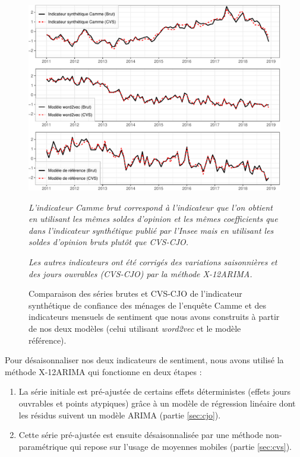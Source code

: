 \documentclass[11pt,french,french]{article}
\begin{document}
\begin{figure}[htp]
{\centering\includegraphics[width = \textwidth]{img/rmd-graphCVS-1}}
\captionsetup{margin=0cm,format=hang,justification=justified}
\caption{Comparaison des séries brutes et CVS-CJO de l'indicateur synthétique de confiance des ménages de l'enquête Camme et des indicateurs mensuels de sentiment que nous avons construits à partir de nos deux modèles (celui utilisant  \emph{word2vec} et le modèle référence).}\label{fig:cvscjo}
\footnotesize

\emph{L'indicateur Camme brut correspond à l'indicateur que l'on obtient en utilisant les mêmes soldes d'opinion et les mêmes coefficients que dans l'indicateur synthétique publié par l'Insee mais en utilisant les soldes d'opinion bruts plutôt que CVS-CJO.}

\emph{Les autres indicateurs ont été corrigés des variations saisonnières et des jours ouvrables (CVS-CJO) par la méthode X-12ARIMA.}
\end{figure}

Pour désaisonnaliser nos deux indicateurs de sentiment, nous avons utilisé la méthode X-12ARIMA qui fonctionne en deux étapes :

\begin{enumerate}
\def\labelenumi{\arabic{enumi}.}
\item
  La série initiale est pré-ajustée de certains effets déterministes (effets jours ouvrables et points atypiques) grâce à un modèle de régression linéaire dont les résidus suivent un modèle ARIMA (partie \ref{sec:cjo}).
\item
  Cette série pré-ajustée est ensuite désaisonnalisée par une méthode non-paramétrique qui repose sur l'usage de moyennes mobiles (partie \ref{sec:cvs}).
\end{enumerate}
\end{document}
